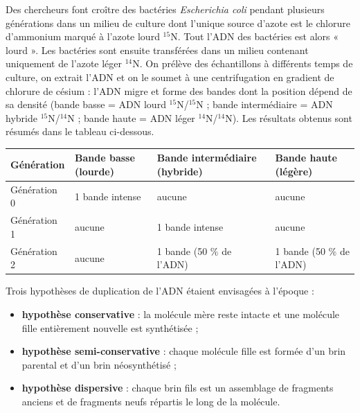\documentclass[11pt]{article}
\begin{document}
\begin{exercice}
Des chercheurs font croître des bactéries \emph{Escherichia coli} pendant plusieurs générations dans un milieu de culture dont l'unique source d'azote est le chlorure d'ammonium marqué à l'azote lourd $^{15}$N. Tout l'ADN des bactéries est alors « lourd ». Les bactéries sont ensuite transférées dans un milieu contenant uniquement de l'azote léger $^{14}$N. On prélève des échantillons à différents temps de culture, on extrait l'ADN et on le soumet à une centrifugation en gradient de chlorure de césium : l'ADN migre et forme des bandes dont la position dépend de sa densité (bande basse = ADN lourd $^{15}$N/$^{15}$N ; bande intermédiaire = ADN hybride $^{15}$N/$^{14}$N ; bande haute = ADN léger $^{14}$N/$^{14}$N). Les résultats obtenus sont résumés dans le tableau ci-dessous.

\begin{center}
\begin{tabularx}{\linewidth}{|l|X|X|X|}
\hline
\rowcolor{popblueL}
\textbf{Génération} & \textbf{Bande basse (lourde)} & \textbf{Bande intermédiaire (hybride)} & \textbf{Bande haute (légère)} \\
\hline
Génération 0 & 1 bande intense & aucune & aucune \\
\hline
Génération 1 & aucune & 1 bande intense & aucune \\
\hline
Génération 2 & aucune & 1 bande (50 \% de l'ADN) & 1 bande (50 \% de l'ADN) \\
\hline
\end{tabularx}
\end{center}

Trois hypothèses de duplication de l'ADN étaient envisagées à l'époque :
\begin{itemize}
\item \textbf{hypothèse conservative} : la molécule mère reste intacte et une molécule fille entièrement nouvelle est synthétisée ;
\item \textbf{hypothèse semi-conservative} : chaque molécule fille est formée d'un brin parental et d'un brin néosynthétisé ;
\item \textbf{hypothèse dispersive} : chaque brin fils est un assemblage de fragments anciens et de fragments neufs répartis le long de la molécule.
\end{itemize}


\end{exercice}
\end{document}
